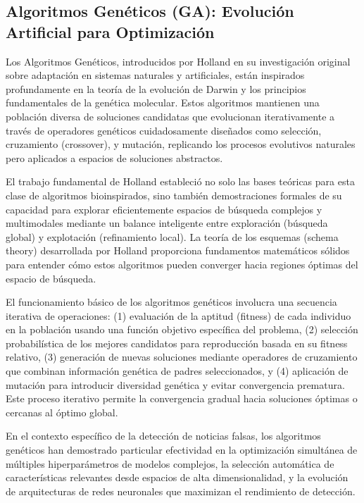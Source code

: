 \subsection{Algoritmos Genéticos (GA): Evolución Artificial para Optimización}

Los Algoritmos Genéticos, introducidos por Holland \cite{holland1992adaptation} en su investigación original sobre adaptación en sistemas naturales y artificiales, están inspirados profundamente en la teoría de la evolución de Darwin y los principios fundamentales de la genética molecular. Estos algoritmos mantienen una población diversa de soluciones candidatas que evolucionan iterativamente a través de operadores genéticos cuidadosamente diseñados como selección, cruzamiento (crossover), y mutación, replicando los procesos evolutivos naturales pero aplicados a espacios de soluciones abstractos.

El trabajo fundamental de Holland estableció no solo las bases teóricas para esta clase de algoritmos bioinspirados, sino también demostraciones formales de su capacidad para explorar eficientemente espacios de búsqueda complejos y multimodales mediante un balance inteligente entre exploración (búsqueda global) y explotación (refinamiento local). La teoría de los esquemas (schema theory) desarrollada por Holland proporciona fundamentos matemáticos sólidos para entender cómo estos algoritmos pueden converger hacia regiones óptimas del espacio de búsqueda.

El funcionamiento básico de los algoritmos genéticos involucra una secuencia iterativa de operaciones: (1) evaluación de la aptitud (fitness) de cada individuo en la población usando una función objetivo específica del problema, (2) selección probabilística de los mejores candidatos para reproducción basada en su fitness relativo, (3) generación de nuevas soluciones mediante operadores de cruzamiento que combinan información genética de padres seleccionados, y (4) aplicación de mutación para introducir diversidad genética y evitar convergencia prematura. Este proceso iterativo permite la convergencia gradual hacia soluciones óptimas o cercanas al óptimo global.

En el contexto específico de la detección de noticias falsas, los algoritmos genéticos han demostrado particular efectividad en la optimización simultánea de múltiples hiperparámetros de modelos complejos, la selección automática de características relevantes desde espacios de alta dimensionalidad, y la evolución de arquitecturas de redes neuronales que maximizan el rendimiento de detección.


